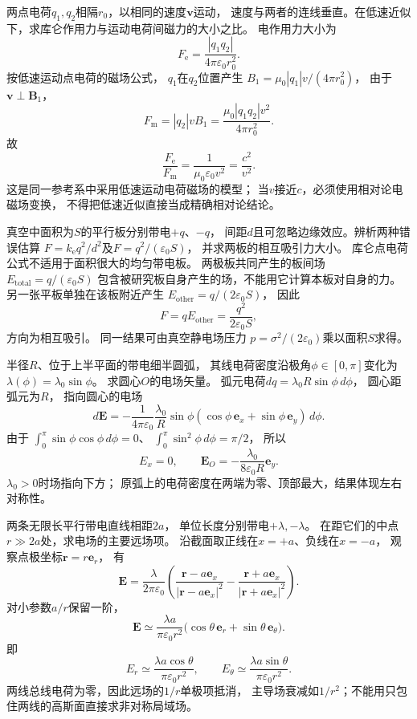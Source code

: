 
\problemtext 两点电荷$q_1,q_2$相隔$r_0$，以相同的速度$\bm v$运动，
速度与两者的连线垂直。在低速近似下，求库仑作用力与运动电荷间磁力的大小之比。
\workings
电作用力大小为
\[
F_{\mathrm e}=\frac{|q_1q_2|}{4\pi\varepsilon_0r_0^2}.
\]
按低速运动点电荷的磁场公式，
$q_1$在$q_2$位置产生
$B_1=\mu_0|q_1|v/(4\pi r_0^2)$，
由于$\bm v\perp\bm B_1$，
\[
F_{\mathrm m}=|q_2|v B_1
=\frac{\mu_0|q_1q_2|v^2}{4\pi r_0^2}.
\]
故
\[
\boxed{\frac{F_{\mathrm e}}{F_{\mathrm m}}
=\frac{1}{\mu_0\varepsilon_0v^2}
=\frac{c^2}{v^2}}.
\]
\crosscheck 这是同一参考系中采用低速运动电荷磁场的模型；
当$v$接近$c$，必须使用相对论电磁场变换，
不得把低速近似直接当成精确相对论结论。

\problemtext 真空中面积为$S$的平行板分别带电$+q$、$-q$，
间距$d$且可忽略边缘效应。辨析两种错误估算
$F=k_{\mathrm e}q^2/d^2$及$F=q^2/(\varepsilon_0S)$，
并求两板的相互吸引力大小。
\workings
库仑点电荷公式不适用于面积很大的均匀带电板。
两极板共同产生的板间场
$E_{\mathrm{total}}=q/(\varepsilon_0S)$
包含被研究板自身产生的场，不能用它计算本板对自身的力。
另一张平板单独在该板附近产生
$E_{\mathrm{other}}=q/(2\varepsilon_0S)$，
因此
\[
\boxed{F=qE_{\mathrm{other}}
=\frac{q^2}{2\varepsilon_0S}},
\]
方向为相互吸引。
\crosscheck 同一结果可由真空静电场压力
$p=\sigma^2/(2\varepsilon_0)$乘以面积$S$求得。

\problemtext 半径$R$、位于上半平面的带电细半圆弧，
其线电荷密度沿极角$\phi\in[0,\pi]$变化为
$\lambda(\phi)=\lambda_0\sin\phi$。
求圆心$O$的电场矢量。
\workings
弧元电荷$dq=\lambda_0R\sin\phi\,d\phi$，
圆心距弧元为$R$，
指向圆心的电场
\[
d\bm E=-\frac{1}{4\pi\varepsilon_0}
\frac{\lambda_0}{R}\sin\phi
(\cos\phi\,\bm e_x+\sin\phi\,\bm e_y)\,d\phi.
\]
由于
$\int_0^\pi\sin\phi\cos\phi\,d\phi=0$、
$\int_0^\pi\sin^2\phi\,d\phi=\pi/2$，
所以
\[
\boxed{E_x=0,\qquad
\bm E_O=-\frac{\lambda_0}{8\varepsilon_0R}\bm e_y}.
\]
\crosscheck $\lambda_0>0$时场指向下方；
原弧上的电荷密度在两端为零、顶部最大，结果体现左右对称性。

\problemtext 两条无限长平行带电直线相距$2a$，
单位长度分别带电$+\lambda,-\lambda$。
在距它们的中点$r\gg2a$处，求电场的主要远场项。
\workings
沿截面取正线在$x=+a$、负线在$x=-a$，
观察点极坐标$\bm r=r\bm e_r$，
有
\[
\bm E=\frac{\lambda}{2\pi\varepsilon_0}
\left(\frac{\bm r-a\bm e_x}{|\bm r-a\bm e_x|^2}
-\frac{\bm r+a\bm e_x}{|\bm r+a\bm e_x|^2}\right).
\]
对小参数$a/r$保留一阶，
\[
\boxed{\bm E\simeq\frac{\lambda a}{\pi\varepsilon_0r^2}
\bigl(\cos\theta\,\bm e_r+\sin\theta\,\bm e_\theta\bigr)}.
\]
即
\[
\boxed{E_r\simeq\frac{\lambda a\cos\theta}{\pi\varepsilon_0r^2},
\qquad E_\theta\simeq\frac{\lambda a\sin\theta}{\pi\varepsilon_0r^2}}.
\]
\crosscheck 两线总线电荷为零，因此远场的$1/r$单极项抵消，
主导场衰减如$1/r^2$；不能用只包住两线的高斯面直接求非对称局域场。

